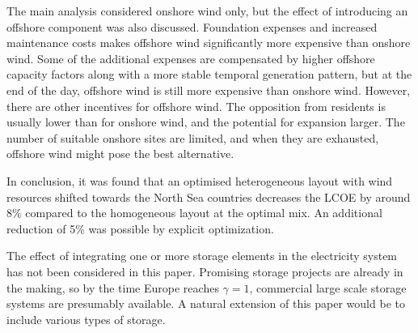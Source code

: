 \documentclass[a4paper, 5p, sort&compress]{elsarticle}%
\begin{document}
{%

The main analysis considered onshore wind only, but the effect of
introducing an offshore component was also discussed. Foundation
expenses and increased maintenance costs makes offshore wind
significantly more expensive than onshore wind. Some of the additional
expenses are compensated by higher offshore capacity factors along
with a more stable temporal generation pattern, but at the end of the
day, offshore wind is still more expensive than onshore wind. However,
there are other incentives for offshore wind. The opposition from
residents is usually lower than for onshore wind, and the potential
for expansion larger. The number of suitable onshore sites are
limited, and when they are exhausted, offshore wind might pose the
best alternative.

In conclusion, it was found that an optimised heterogeneous layout
with wind resources shifted towards the North Sea countries decreases
the LCOE by around 8\% compared to the homogeneous layout at the
optimal mix. An additional reduction of 5\% was possible by explicit
optimization. \newline


The effect of integrating one or more storage elements in the
electricity system has not been considered in this paper. Promising
storage projects are already in the making, so by the time Europe reaches
$\gamma = 1$, commercial large scale storage systems are presumably
available. A natural extension of this paper would be to include
various types of storage.


}
\end{document}

